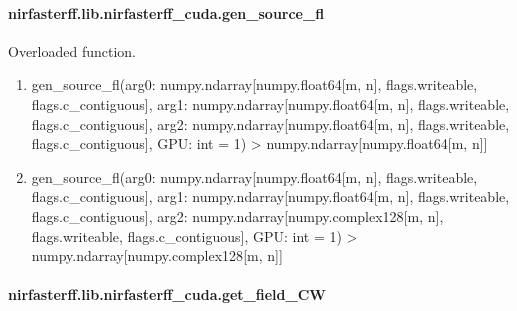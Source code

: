 \documentclass[letterpaper,10pt,english]{sphinxmanual}
\begin{document}
\sphinxstepscope


\paragraph{nirfasterff.lib.nirfasterff\_cuda.gen\_source\_fl}
\label{\detokenize{_autosummary/nirfasterff.lib.nirfasterff_cuda.gen_source_fl:nirfasterff-lib-nirfasterff-cuda-gen-source-fl}}\label{\detokenize{_autosummary/nirfasterff.lib.nirfasterff_cuda.gen_source_fl::doc}}

\begin{fulllineitems}
\label{\detokenize{_autosummary/nirfasterff.lib.nirfasterff_cuda.gen_source_fl:nirfasterff.lib.nirfasterff_cuda.gen_source_fl}}
\pysigstartsignatures
\pysiglinewithargsret
{}
{\sphinxparamcomma {}}
{}
\pysigstopsignatures
\sphinxAtStartPar
Overloaded function.
\begin{enumerate}
%
\item {} 
\sphinxAtStartPar
gen\_source\_fl(arg0: numpy.ndarray{[}numpy.float64{[}m, n{]}, flags.writeable, flags.c\_contiguous{]}, arg1: numpy.ndarray{[}numpy.float64{[}m, n{]}, flags.writeable, flags.c\_contiguous{]}, arg2: numpy.ndarray{[}numpy.float64{[}m, n{]}, flags.writeable, flags.c\_contiguous{]}, GPU: int = \sphinxhyphen{}1) \sphinxhyphen{}\textgreater{} numpy.ndarray{[}numpy.float64{[}m, n{]}{]}

\item {} 
\sphinxAtStartPar
gen\_source\_fl(arg0: numpy.ndarray{[}numpy.float64{[}m, n{]}, flags.writeable, flags.c\_contiguous{]}, arg1: numpy.ndarray{[}numpy.float64{[}m, n{]}, flags.writeable, flags.c\_contiguous{]}, arg2: numpy.ndarray{[}numpy.complex128{[}m, n{]}, flags.writeable, flags.c\_contiguous{]}, GPU: int = \sphinxhyphen{}1) \sphinxhyphen{}\textgreater{} numpy.ndarray{[}numpy.complex128{[}m, n{]}{]}

\end{enumerate}

\end{fulllineitems}


\sphinxstepscope


\paragraph{nirfasterff.lib.nirfasterff\_cuda.get\_field\_CW}
\label{\detokenize{_autosummary/nirfasterff.lib.nirfasterff_cuda.get_field_CW:nirfasterff-lib-nirfasterff-cuda-get-field-cw}}\label{\detokenize{_autosummary/nirfasterff.lib.nirfasterff_cuda.get_field_CW::doc}}
\end{document}
